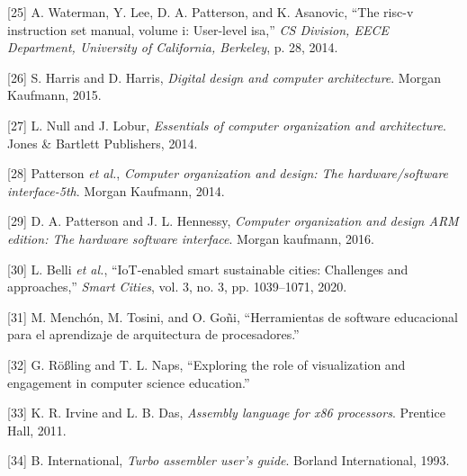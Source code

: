\documentclass[12pt,oneside]{templates/unerthesis}
\newcommand{\CSLLeftMargin}[1]{#1} %
\newcommand{\CSLRightInline}[1]{#1} %
\newlength{\cslhangindent}
\newenvironment{CSLReferences}[2] %
 {\setlength{\parindent}{0pt}%
  \setlength{\leftskip}{#1 pt\relax}%
  \setlength{\parskip}{#2 pt\relax}%
  \everypar{\setlength{\hangindent}{\cslhangindent}}}
 {\par}
\begin{document}
\begin{CSLReferences}{0}{0}
\leavevmode{}%
\CSLLeftMargin{{[}25{]} }%
\CSLRightInline{A. Waterman, Y. Lee, D. A. Patterson, and K. Asanovic, {``The risc-v instruction set manual, volume i: User-level isa,''} \emph{CS Division, EECE Department, University of California, Berkeley}, p. 28, 2014.}

\leavevmode{}%
\CSLLeftMargin{{[}26{]} }%
\CSLRightInline{S. Harris and D. Harris, \emph{Digital design and computer architecture}. Morgan Kaufmann, 2015.}

\leavevmode{}%
\CSLLeftMargin{{[}27{]} }%
\CSLRightInline{L. Null and J. Lobur, \emph{Essentials of computer organization and architecture}. Jones \& Bartlett Publishers, 2014.}

\leavevmode{}%
\CSLLeftMargin{{[}28{]} }%
\CSLRightInline{Patterson \emph{et al.}, \emph{Computer organization and design: The hardware/software interface-5th}. Morgan Kaufmann, 2014.}

\leavevmode{}%
\CSLLeftMargin{{[}29{]} }%
\CSLRightInline{D. A. Patterson and J. L. Hennessy, \emph{Computer organization and design ARM edition: The hardware software interface}. Morgan kaufmann, 2016.}

\leavevmode{}%
\CSLLeftMargin{{[}30{]} }%
\CSLRightInline{L. Belli \emph{et al.}, {``IoT-enabled smart sustainable cities: Challenges and approaches,''} \emph{Smart Cities}, vol. 3, no. 3, pp. 1039--1071, 2020.}

\leavevmode{}%
\CSLLeftMargin{{[}31{]} }%
\CSLRightInline{M. Menchón, M. Tosini, and O. Goñi, {``Herramientas de software educacional para el aprendizaje de arquitectura de procesadores.''}}

\leavevmode{}%
\CSLLeftMargin{{[}32{]} }%
\CSLRightInline{G. Rößling and T. L. Naps, {``Exploring the role of visualization and engagement in computer science education.''}}

\leavevmode{}%
\CSLLeftMargin{{[}33{]} }%
\CSLRightInline{K. R. Irvine and L. B. Das, \emph{Assembly language for x86 processors}. Prentice Hall, 2011.}

\leavevmode{}%
\CSLLeftMargin{{[}34{]} }%
\CSLRightInline{B. International, \emph{Turbo assembler user's guide}. Borland International, 1993.}


\end{CSLReferences}
\end{document}
